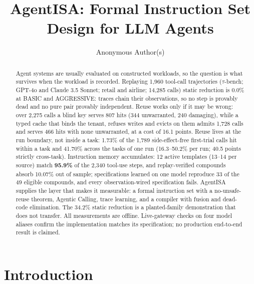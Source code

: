 \documentclass[
  sigconf,
  anonymous]{acmart}
\title{AgentISA: Formal Instruction Set Design for LLM Agents}
\author{Anonymous Author(s)}
\date{}
\newcounter{none} %
\begin{document}
\begin{abstract}
Agent systems are usually evaluated on constructed workloads, so the
question is what survives when the workload is recorded. Replaying 1,960
tool-call trajectories (\(\tau\)-bench; GPT-4o and Claude 3.5 Sonnet;
retail and airline; 14,285 calls) static reduction is 0.0\% at BASIC and
AGGRESSIVE: traces chain their observations, so no step is provably dead
and no pure pair provably independent. Reuse works only if it may be
wrong: over 2,275 calls a blind key serves 807 hits (344 unwarranted,
240 damaging), while a typed cache that binds the tenant, refuses writes
and evicts on them admits 1,728 calls and serves 466 hits with none
unwarranted, at a cost of 16.1 points. Reuse lives at the run boundary,
not inside a task: 1.73\% of the 1,789 side-effect-free first-trial
calls hit within a task and 41.70\% across the tasks of one run
(16.3--50.2\% per run; 40.5 points strictly cross-task). Instruction
memory accumulates: 12 active templates (13--14 per source) match
\textbf{95.9\%} of the 2,340 tool-use steps, and replay-verified
compounds absorb 10.07\% out of sample; specifications learned on one
model reproduce 33 of the 49 eligible compounds, and every
observation-wired specification fails. AgentISA supplies the layer that
makes it measurable: a formal instruction set with a no-unsafe-reuse
theorem, Agentic Calling, trace learning, and a compiler with fusion and
dead-code elimination. The 34.2\% static reduction is a planted-family
demonstration that does not transfer. All measurements are offline.
Live-gateway checks on four model aliases confirm the implementation
matches its specification; no production end-to-end result is claimed.
\end{abstract}
\maketitle

\section{Introduction}\label{introduction}
\end{document}
